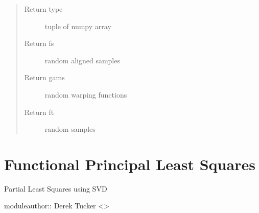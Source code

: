 \documentclass[letterpaper,10pt,english]{sphinxmanual}
\begin{document}
\begin{fulllineitems}
\begin{quote}
\begin{description}
\item[{Return type}] \leavevmode
tuple of numpy array

\item[{Return fs}] \leavevmode
random aligned samples

\item[{Return gams}] \leavevmode
random warping functions

\item[{Return ft}] \leavevmode
random samples

\end{description}\end{quote}

\end{fulllineitems}



\chapter{Functional Principal Least Squares}
\label{\detokenize{fPLS:module-fPLS}}\label{\detokenize{fPLS:functional-principal-least-squares}}\label{\detokenize{fPLS::doc}}
Partial Least Squares using SVD

moduleauthor:: Derek Tucker \textless{}\textgreater{}
\end{document}

